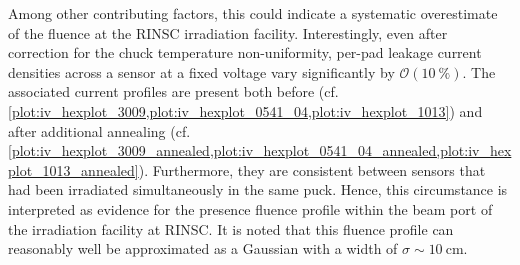 Among other contributing factors, this could indicate a systematic overestimate of the fluence at the RINSC irradiation facility.\newline 
Interestingly, even after correction for the chuck temperature non-uniformity, per-pad leakage current densities across a sensor at a fixed voltage vary significantly by $\mathcal{O}(10~\%)$.
The associated current profiles are present both before (cf. \ref{plot:iv_hexplot_3009,plot:iv_hexplot_0541_04,plot:iv_hexplot_1013}) and after additional annealing (cf. \ref{plot:iv_hexplot_3009_annealed,plot:iv_hexplot_0541_04_annealed,plot:iv_hexplot_1013_annealed}).
Furthermore, they are consistent between sensors that had been irradiated simultaneously in the same puck.
Hence, this circumstance is interpreted as evidence for the presence fluence profile within the beam port of the irradiation facility at RINSC.
It is noted that this fluence profile can reasonably well be approximated as a Gaussian with a width of $\sigma\sim\SI{10}{\centi\metre}$.
